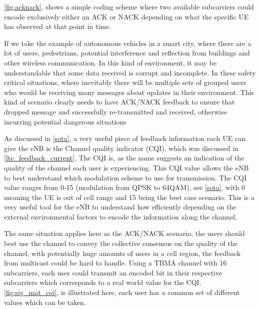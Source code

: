 \documentclass{article}
\begin{document}
\cref{fig:acknack}, shows a simple coding scheme where two available subcarriers could encode exclusively either an ACK or NACK depending on what the specific UE has observed at that point in time.

If we take the example of autonomous vehicles in a smart city, where there are a lot of users, pedestrians, potential interference and reflection from buildings and other wireless communication. In this kind of environment, it may be understandable that some data received is corrupt and incomplete. In these safety critical situations, where inevitably there will be multiple sets of grouped users who would be receiving many messages about updates in their environment. This kind of scenario clearly needs to have ACK/NACK feedback to ensure that dropped message and successfully re-transmitted and received, otherwise incurring potential dangerous situations 


As discussed in \cref{sota}, a very useful piece of feedback information each UE can give the eNB is the Channel quality indicator (CQI), which was discussed in \cref{lte_feedback_current}, The CQI is, as the name suggests an indication of the quality of the channel each user is experiencing. This CQI value allows the eNB to best understand which modulation scheme to use for transmission. The CQI value ranges from 0-15 (modulation from QPSK to 64QAM), see \cref{sota}, with 0 meaning the UE is out of cell range and 15 being the best case scenario. This is a very useful tool for the eNB to understand how efficiently depending on the external environmental factors to encode the information along the channel. 

The same situation applies here as the ACK/NACK scenario, the users should best use the channel to convey the collective consensus on the quality of the channel, with potentially huge amounts of users in a cell region, the feedback from multicast could be hard to handle. Using a TBMA channel with 16 subcarriers, each user could transmit an encoded bit in their respective subcarriers which corresponds to a real world value for the CQI. \cref{fig:sig_mat_cqi}, is illustrated here, each user has a common set of different values which can be taken. 
\end{document}
